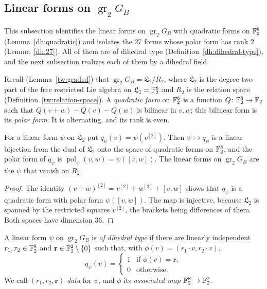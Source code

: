 \subsection{\texorpdfstring{Linear forms on $\operatorname{gr}_2G_B$}{Linear forms on gr\_2 G\_B}}
\label{dh:forms-section}
This subsection identifies the linear forms on $\operatorname{gr}_2G_B$
with quadratic forms on $\mathbb F_2^8$ (Lemma~\ref{dh:quadratic}) and isolates the
$27$ forms whose polar form has rank $2$ (Lemma~\ref{dh:27}). All of them
are of dihedral type (Definition~\ref{dh:dihedral-type}), and the next
subsection realizes each of them by a dihedral field.

Recall (Lemma~\ref{tw:graded}) that $\operatorname{gr}_2G_B=\mathfrak
L_2/R_2$, where $\mathfrak L_2$ is the degree-two part of the free
restricted Lie algebra on $\mathfrak L_1=\mathbb F_2^8$ and $R_2$ is the relation
space (Definition~\ref{tw:relation-space}). A \emph{quadratic form} on
$\mathbb F_2^8$ is a function $Q\colon\mathbb F_2^8\to\mathbb F_2$ such that
$Q(v+w)-Q(v)-Q(w)$ is bilinear in $v,w$; this bilinear form is its
\emph{polar form}. It is alternating, and its rank is even.

\begin{lemma}\label{dh:quadratic}
For a linear form $\psi$ on $\mathfrak L_2$ put $q_\psi(v)=\psi(v^{[2]})$.
Then $\psi\mapsto q_\psi$ is a linear bijection from the dual of
$\mathfrak L_2$ onto the space of quadratic forms on $\mathbb F_2^8$, and the polar
form of $q_\psi$ is $\operatorname{pol}_\psi(v,w)=\psi([v,w])$. The linear
forms on $\operatorname{gr}_2G_B$ are the $\psi$ that vanish on $R_2$.
\end{lemma}

\begin{proof}
The identity $(v+w)^{[2]}=v^{[2]}+w^{[2]}+[v,w]$ shows that $q_\psi$ is a
quadratic form with polar form $\psi([v,w])$. The map is injective, because
$\mathfrak L_2$ is spanned by the restricted squares $v^{[2]}$, the brackets
being differences of them. Both spaces have dimension $36$.
\end{proof}

\begin{definition}\label{dh:dihedral-type}
A linear form $\psi$ on $\operatorname{gr}_2G_B$ is \emph{of dihedral type} if
there are linearly independent $r_1,r_2\in\mathbb F_2^8$ and
$\mathbf r\in\mathbb F_2^2\setminus\{0\}$ such that, with
$\phi(v)=(r_1\cdot v,r_2\cdot v)$,
\[
 q_\psi(v)=\begin{cases}1&\text{if }\phi(v)=\mathbf r,\\0&\text{otherwise.}
 \end{cases}
\]
We call $(r_1,r_2,\mathbf r)$ \emph{data} for $\psi$, and $\phi$ its
\emph{associated map} $\mathbb F_2^8\to\mathbb F_2^2$.
\end{definition}

